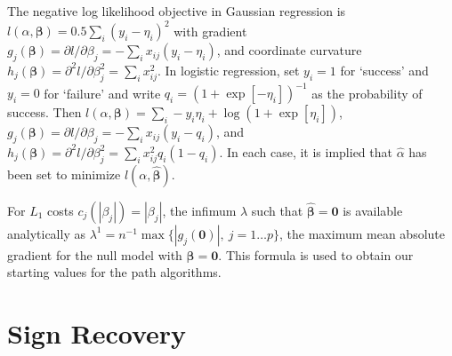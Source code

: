 \documentclass[12pt]{article}
\newcommand{\bs}[1]{\boldsymbol{#1}}
\newcommand{\bm}[1]{\mathbf{#1}}
\begin{document}
The negative log likelihood objective in Gaussian regression is $
l(\alpha,\bs{\beta}) = 0.5\sum_i (y_i -\eta_i)^2 $ with gradient
$g_j(\bs{\beta}) = \partial l/\partial \beta_j = -\sum_i x_{ij}(y_i -
\eta_i)$, and coordinate curvature $h_j(\bs{\beta}) = \partial^2 l/\partial
\beta_j^2 = \sum_i x_{ij}^2$. In logistic regression, set $y_i = 1$ for
`success' and $y_i = 0$ for `failure' and write $q_i = (1 +
\exp[-\eta_i])^{-1}$ as the probability of success.  Then
$l(\alpha,\bs{\beta}) = \sum_i -y_i\eta_i + \log(1 +
  \exp[\eta_i])$,
$
g_j(\bs{\beta}) = \partial l/\partial \beta_j = -\sum_i
x_{ij}(y_i - q_i)$, and
$h_j(\bs{\beta}) = \partial^2 l/\partial \beta_j^2 = \sum_i
x_{ij}^2q_i(1-q_i)
$.
In each case, it is implied that $\hat\alpha$ has been set
to minimize $l(\alpha,\bs{\hat\beta})$. 

For $L_1$ costs $c_j(|\beta_j|) = |\beta_j|$, the infimum $\lambda$ such
that $\bs{\hat\beta} = \bm{0}$ is  available analytically as
$\lambda^1 =
n^{-1}\max\{|g_j(\bm{0})|,~j=1\ldots p\}$, the maximum mean
absolute gradient for the null model with $\bs{\beta} = \bm{0}$.  This formula
is used to obtain our starting values for the path algorithms.

\section{Sign Recovery}
\label{extraproof}
\end{document}
